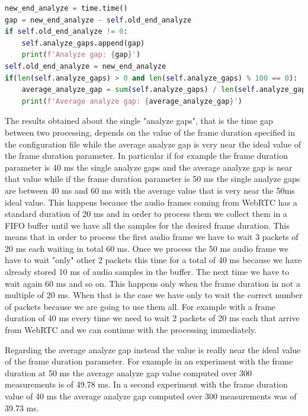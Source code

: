 \documentclass[../main.tex]{subfiles}
\begin{document}
\begin{lstlisting}[language=Python, caption={System throughput analysis implementation}]
new_end_analyze = time.time()
gap = new_end_analyze - self.old_end_analyze
if self.old_end_analyze != 0:
    self.analyze_gaps.append(gap)
    print(f'Analyze gap: {gap}')
self.old_end_analyze = new_end_analyze
if(len(self.analyze_gaps) > 0 and len(self.analyze_gaps) % 100 == 0):
    average_analyze_gap = sum(self.analyze_gaps) / len(self.analyze_gaps)
    print(f'Average analyze gap: {average_analyze_gap}')
\end{lstlisting}
\label{listing:throughput implementation}

The results obtained about the single "analyze gaps", that is the time gap between two processing, depends on the value of the frame duration specified in the configuration file while the average analyze gap is very near the ideal value of the frame duration parameter. In particular if for example the frame duration parameter is 40 ms the single analyze gaps and the average analyze gap is near that value while if the frame duration parameter is 50 ms the single analyze gaps are between 40 ms and 60 ms with the average value that is very near the 50ms ideal value. This happens because the audio frames coming from WebRTC has a standard duration of 20 ms and in order to process them we collect them in a FIFO buffer until we have all the samples for the desired frame duration. This means that in order to process the first audio frame we have to wait 3 packets of 20 ms each waiting in total 60 ms. Once we process the 50 ms audio frame we have to wait "only" other 2 packets this time for a total of 40 ms because we have already stored 10 ms of audio samples in the buffer. The next time we have to wait again 60 ms and so on. This happens only when the frame duration in not a multiple of 20 ms. When that is the case we have only to wait the correct number of packets because we are going to use them all. For example with a frame duration of 40 ms every time we need to wait 2 packets of 20 ms each that arrive from WebRTC and we can continue with the processing immediately. 

Regarding the average analyze gap instead the value is really near the ideal value of the frame duration parameter. For example in an experiment with the frame duration at 50 ms the average analyze gap value computed over 300 measurements is of 49.78 ms. In a second experiment with the frame duration value of 40 ms the average analyze gap computed over 300 measurements was of 39.73 ms. 
\end{document}
